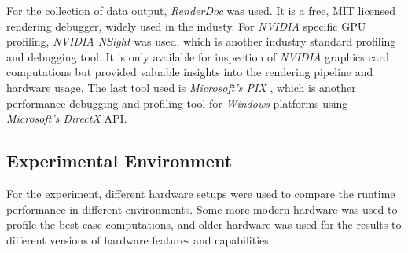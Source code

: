 \noindent
For the collection of data output, \emph{RenderDoc} \cite{RenderDoc} was used. It is a free, MIT licensed 
rendering debugger, widely used in the industy. For \emph{NVIDIA} specific \ac{GPU} profiling, \emph{NVIDIA NSight} 
\cite{NSight} was used, which is another industry standard profiling and debugging tool. It is only available for 
inspection of \emph{NVIDIA} graphics card computations but provided valuable insights into the rendering pipeline 
and hardware usage. The last tool used is \emph{Microsoft's PIX} \cite{PIX}, which is another performance debugging 
and profiling tool for \emph{Windows} platforms using \emph{Microsoft's DirectX} \ac{API}.


\subsection*{Experimental Environment} \label{subsec-experimental-environment}

For the experiment, different hardware setups were used to compare the runtime performance in different environments.
Some more modern hardware was used to profile the best case computations, and older hardware was used for the results 
to different versions of hardware features and capabilities.

